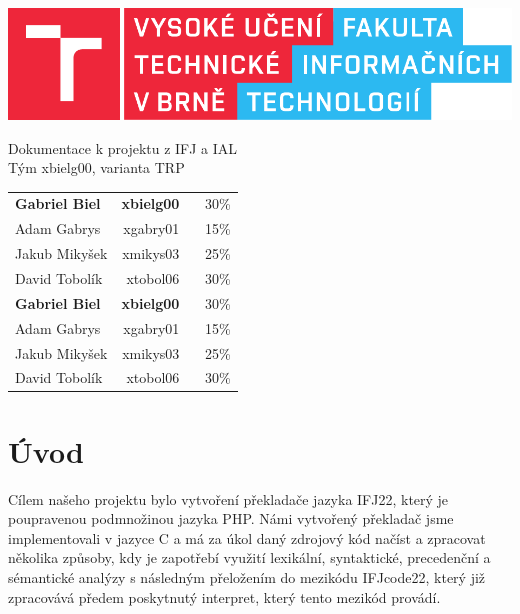 \documentclass[a4paper, 12pt]{article}
\begin{document}
    \begin{titlepage}
		\centering

        \includegraphics{src/fitlogo.pdf}


        {\Huge Dokumentace k projektu z IFJ a IAL\\[0.4em]
            \LARGE Tým xbielg00, varianta TRP}


        \begin{table}[H]
            \hfill
            \begin{tabularx}{0.5\textwidth}{Xr}
                \textbf{Gabriel Biel} & \textbf{xbielg00 }\ \ \ 30\%\\
                Adam Gabrys & xgabry01  \ \ \ 15\% \\
                Jakub Mikyšek & xmikys03  \ \ \ 25\% \\
                David Tobolík & xtobol06  \ \ \ 30\% \\
                \textbf{Gabriel Biel} & \textbf{xbielg00 }\ \ \ 30\%\\
                Adam Gabrys & xgabry01  \ \ \ 15\% \\
                Jakub Mikyšek & xmikys03  \ \ \ 25\% \\
                David Tobolík & xtobol06  \ \ \ 30\% \\
            \end{tabularx}
        \end{table}
	\end{titlepage}

    \tableofcontents
    \newpage

    \section{Úvod}
    Cílem našeho projektu bylo vytvoření překladače jazyka IFJ22, který je poupravenou podmnožinou jazyka PHP. Námi vytvořený překladač jsme implementovali v jazyce C a  má za úkol daný zdrojový kód načíst a zpracovat několika způsoby, kdy je zapotřebí využití lexikální, syntaktické, precedenční a sémantické analýzy s následným přeložením do mezikódu IFJcode22, který již zpracovává předem poskytnutý interpret, který tento mezikód provádí.
\end{document}
